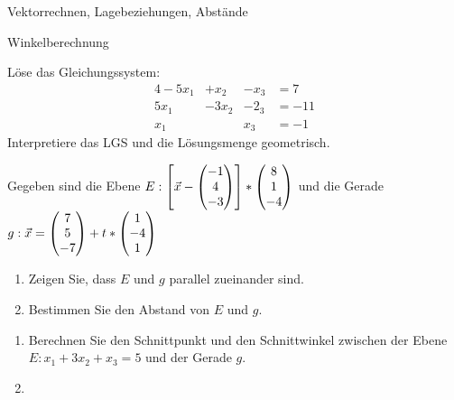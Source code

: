 

\newcommand{\vektor}[1]{\ensuremath\begin{pmatrix} #1 \end{pmatrix}}


\begin{inhalt}
	\item Vektorrechnen, Lagebeziehungen, Abstände
	\item Winkelberechnung
\end{inhalt}

Löse das Gleichungssystem:
\begin{alignat*}{4}
	-5x_1& +x_2& -x_3& = 7\\
	5x_1&  -3x_2& -2_3& = -11\\
	x_1& & x_3& =-1
\end{alignat*}
Interpretiere das LGS und die Lösungsmenge geometrisch.

Gegeben sind die Ebene $E: \left[ \vec x -  \vektor{-1 \\ 4\\ -3}\right]*\vektor{8\\ 1 \\-4}$ und die Gerade $g: \vec x=\vektor{7\\5\\-7}+t*\vektor{1\\-4\\1}$
\begin{enumerate}
	\item Zeigen Sie, dass $E$ und $g$ parallel zueinander sind.
	\item Bestimmen Sie den Abstand von $E$ und $g$.
\end{enumerate}

\begin{enumerate}
	\item Berechnen Sie den Schnittpunkt und den Schnittwinkel zwischen der Ebene $E: x_1+3x_2+x_3=5$ und der Gerade $g$.
	\item
\end{enumerate}


